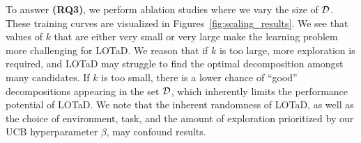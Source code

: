 To answer \textbf{(RQ3)}, we perform ablation studies where we vary the size of $\mathcal{D}$. These training curves are visualized in Figures~\ref{fig:scaling_results}. We see that values of $k$ that are either very small or very large make the learning problem more challenging for LOTaD. We reason that if $k$ is too large, more exploration is required, and LOTaD may struggle to find the optimal decomposition amongst many candidates. If $k$ is too small, there is a lower chance of ``good'' decompositions appearing in the set $\mathcal{D}$, which inherently limits the performance potential of LOTaD. We note that the inherent randomness of LOTaD, as well as the choice of environment, task, and the amount of exploration prioritized by our UCB hyperparameter $\beta$, may confound results.

